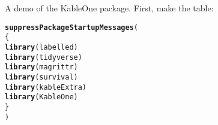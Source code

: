 \documentclass{article}\usepackage[]{graphicx}\usepackage[]{color}
\makeatletter
\newcommand{\hlstd}[1]{\textcolor[rgb]{0.345,0.345,0.345}{#1}}%
\newcommand{\hlkwd}[1]{\textcolor[rgb]{0.737,0.353,0.396}{\textbf{#1}}}%
\newenvironment{kframe}{%
 \def\at@end@of@kframe{}%
 \ifinner\ifhmode%
  \def\at@end@of@kframe{\end{minipage}}%
  \begin{minipage}{\columnwidth}%
 \fi\fi%
 \def\FrameCommand##1{\hskip\@totalleftmargin \hskip-\fboxsep
 \colorbox{shadecolor}{##1}\hskip-\fboxsep
     \hskip-\linewidth \hskip-\@totalleftmargin \hskip\columnwidth}%
 \MakeFramed {\advance\hsize-\width
   \@totalleftmargin\z@ \linewidth\hsize
   \@setminipage}}%
 {\par\unskip\endMakeFramed%
 \at@end@of@kframe}
\newenvironment{knitrout}{}{} %
\makeatother
\begin{document}
A demo of the KableOne package. First, make the table:

\begin{knitrout}
\color{fgcolor}\begin{kframe}
\begin{alltt}
\hlkwd{suppressPackageStartupMessages}\hlstd{(}
  \hlstd{\{}
    \hlkwd{library}\hlstd{(labelled)}
    \hlkwd{library}\hlstd{(tidyverse)}
    \hlkwd{library}\hlstd{(magrittr)}
    \hlkwd{library}\hlstd{(survival)}
    \hlkwd{library}\hlstd{(kableExtra)}
    \hlkwd{library}\hlstd{(KableOne)}
  \hlstd{\}}
\hlstd{)}
\end{alltt}


{\ttfamily\noindent\color{warningcolor}{\#\# Warning: package 'labelled' was built under R version 3.5.3}}

{\ttfamily\noindent\color{warningcolor}{\#\# Warning: package 'tidyr' was built under R version 3.5.3}}


\end{kframe}
\end{knitrout}
\end{document}

